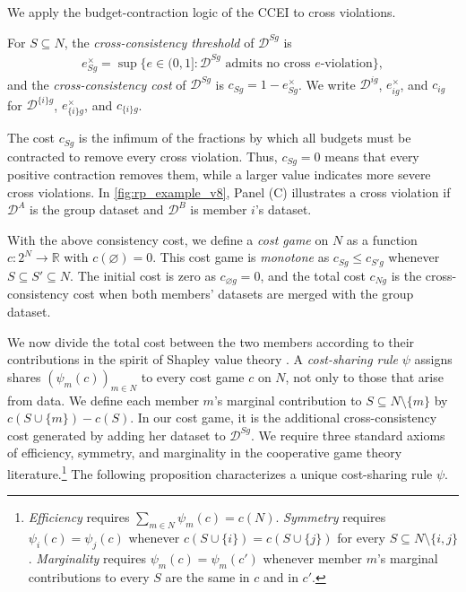 \documentclass[11 pt]{article}
\begin{document}
We apply the budget-contraction logic of the CCEI to cross violations.

\begin{definition}\label{def:cost}\normalfont
For $S \subseteq N$, the \emph{cross-consistency threshold} of $\mathcal{D}^{Sg}$ is
\begin{align*}
e^{\times}_{Sg} = \sup\bigl\{ e \in (0,1] : \mathcal{D}^{Sg} \text{ admits no cross } e\text{-violation} \bigr\},
\end{align*}
and the \emph{cross-consistency cost} of $\mathcal{D}^{Sg}$ is $c_{Sg} = 1 - e^{\times}_{Sg}$. We write $\mathcal{D}^{ig}$, $e^{\times}_{ig}$, and $c_{ig}$ for $\mathcal{D}^{\{i\}g}$, $e^{\times}_{\{i\}g}$, and $c_{\{i\}g}$.
\end{definition}

The cost $c_{Sg}$ is the infimum of the fractions by which all budgets must be contracted to remove every cross violation. Thus, $c_{Sg}=0$ means that every positive contraction removes them, while a larger value indicates more severe cross violations. In \autoref{fig:rp_example_v8}, Panel (C) illustrates a cross violation if $\mathcal D^A$ is the group dataset and $\mathcal D^B$ is member $i$'s dataset.

With the above consistency cost, we define a \emph{cost game} on $N$ as a function $c : 2^{N} \to \mathbb{R}$ with $c(\varnothing) = 0$. This cost game is \emph{monotone} as $c_{Sg} \leq c_{S'g}$ whenever $S \subseteq S' \subseteq N$. The initial cost is zero as $c_{\varnothing g} = 0$, and the total cost $c_{Ng}$ is the cross-consistency cost when both members' datasets are merged with the group dataset.

We now divide the total cost between the two members according to their contributions in the spirit of Shapley value theory \citep{shapley1953value}. A \emph{cost-sharing rule} $\psi$ assigns shares $(\psi_{m}(c))_{m \in N}$ to every cost game $c$ on $N$, not only to those that arise from data. We define each member $m$'s marginal contribution to $S \subseteq N \setminus \{m\}$ by $c(S \cup \{m\}) - c(S)$. In our cost game, it is the additional cross-consistency cost generated by adding her dataset to $\mathcal{D}^{Sg}$. We require three standard axioms of efficiency, symmetry, and marginality in the cooperative game theory literature.\footnote{\emph{Efficiency} requires $\sum_{m \in N} \psi_{m}(c) = c(N)$. \emph{Symmetry} requires $\psi_{i}(c) = \psi_{j}(c)$ whenever $c(S \cup \{i\}) = c(S \cup \{j\})$ for every $S \subseteq N \setminus \{i,j\}$. \emph{Marginality} requires $\psi_{m}(c) = \psi_{m}(c')$ whenever member $m$'s marginal contributions to every $S$ are the same in $c$ and in $c'$.} The following proposition characterizes a unique cost-sharing rule $\psi$.
\end{document}
